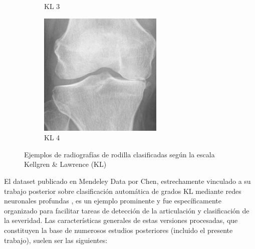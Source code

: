 \documentclass[11pt,spanish,listoffigures,listoftables]{tfgetsinf}
\begin{document}
\begin{figure}[htbp]
\begin{subfigure}[b]{0.19\textwidth}
        \caption{KL 3}
        \label{fig:knee3}
    \end{subfigure}
    \hfill
    \begin{subfigure}[b]{0.19\textwidth}
        \includegraphics[width=\textwidth]{knee_4.png}
        \caption{KL 4}
        \label{fig:knee4}
    \end{subfigure}
    \caption{Ejemplos de radiografías de rodilla clasificadas según la escala Kellgren \& Lawrence (KL)}
    \label{fig:knee-examples}
\end{figure}

El dataset publicado en Mendeley Data por Chen, estrechamente vinculado a su trabajo posterior sobre clasificación automática de grados KL mediante 
redes neuronales profundas \cite{chen2019fully}, es un ejemplo prominente y fue específicamente organizado para facilitar tareas de detección de la articulación y clasificación 
de la severidad. Las características generales de estas versiones procesadas, que constituyen la base de numerosos estudios posteriores (incluido el presente trabajo), suelen ser 
las siguientes:
\end{document}
